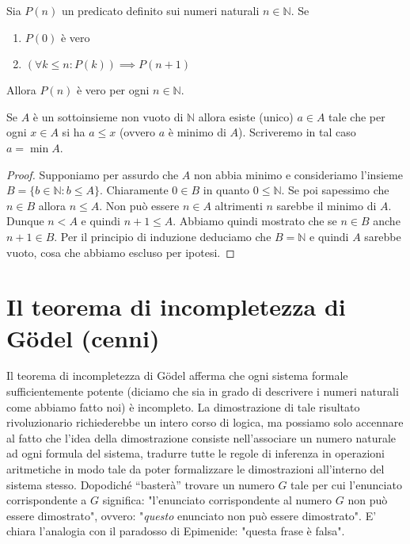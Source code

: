 \documentclass[italian,a4paper,hidelinks,headinclude]{scrartcl}
\newcommand{\NN}{{\mathbb N}}
\begin{document}
\begin{theorem}
Sia $P(n)$ un predicato definito sui numeri naturali $n\in \NN$.
Se
\begin{enumerate}
\item $P(0)$ è vero
\item $(\forall k\le n\colon P(k))\implies P(n+1)$
\end{enumerate}
Allora $P(n)$ è vero per ogni $n\in \NN$.
\end{theorem}

\begin{theorem}[buon ordinamento di $\NN$]
Se $A$ è un sottoinsieme non vuoto di $\NN$ allora esiste (unico) $a \in A$
tale che per ogni $x\in A$ si ha $a\le x$ (ovvero $a$ è minimo di $A$).
Scriveremo in tal caso $a=\min A$.
\end{theorem}
%
\begin{proof}
Supponiamo per assurdo che $A$ non abbia minimo e consideriamo l'insieme
$B=\{b\in \NN\colon b \le A\}$.
Chiaramente $0\in B$ in quanto $0\le \NN$. Se poi sapessimo che $n\in B$
allora $n\le A$. Non può essere $n\in A$ altrimenti $n$ sarebbe il minimo di $A$.
Dunque $n < A$ e quindi $n+1 \le A$. Abbiamo quindi mostrato che se $n\in B$ anche $n+1\in B$.
Per il principio di induzione deduciamo che $B=\NN$ e quindi $A$ sarebbe vuoto,
cosa che abbiamo escluso per ipotesi.
\end{proof}

\section{Il teorema di incompletezza di G\"odel (cenni)}

Il teorema di incompletezza di G\"odel afferma che ogni
sistema formale sufficientemente potente (diciamo che sia in grado di
descrivere i numeri naturali come abbiamo fatto noi) è incompleto.
La dimostrazione di tale risultato rivoluzionario richiederebbe un intero
corso di logica, ma possiamo solo accennare al fatto che l'idea della
dimostrazione consiste nell'associare un numero naturale ad ogni formula
del sistema, tradurre tutte le regole di inferenza in operazioni aritmetiche
in modo tale da poter formalizzare le dimostrazioni all'interno del sistema
stesso. Dopodiché ``basterà'' trovare un numero $G$ tale per cui
l'enunciato corrispondente a $G$ significa:
"l'enunciato corrispondente al numero $G$ non può essere dimostrato",
ovvero: "\emph{questo} enunciato non può essere dimostrato".
E' chiara l'analogia con il paradosso di Epimenide: "questa frase è falsa".
\end{document}
